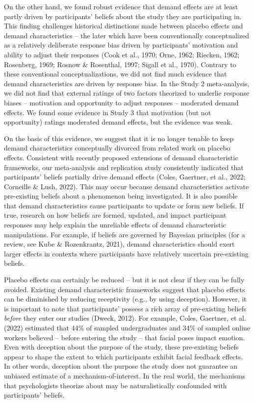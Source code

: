 \documentclass[
  man,floatsintext]{apa6}
\begin{document}
On the other hand, we found robust evidence that demand effects are at least partly driven by participants' beliefs about the study they are participating in. This finding challenges historical distinctions made between placebo effects and demand characteristics -- the later which have been conventionally conceptualized as a relatively deliberate response bias driven by participants' motivation and ability to adjust their responses (Cook et al., 1970; Orne, 1962; Riecken, 1962; Rosenberg, 1969; Rosnow \& Rosenthal, 1997; Sigall et al., 1970). Contrary to these conventional conceptualizations, we did not find much evidence that demand characteristics are driven by response bias. In the Study 2 meta-analysis, we did not find that external ratings of two factors theorized to underlie response biases -- motivation and opportunity to adjust responses -- moderated demand effects. We found some evidence in Study 3 that motivation (but not opportunity) ratings moderated demand effects, but the evidence was weak.

On the basis of this evidence, we suggest that it is no longer tenable to keep demand characteristics conceptually divorced from related work on placebo effects. Consistent with recently proposed extensions of demand characteristic frameworks, our meta-analysis and replication study consistently indicated that participants' beliefs partially drive demand effects (Coles, Gaertner, et al., 2022; Corneille \& Lush, 2022). This may occur because demand characteristics activate pre-existing beliefs about a phenomenon being investigated. It is also possible that demand characteristics cause participants to update or form new beliefs. If true, research on how beliefs are formed, updated, and impact participant responses may help explain the unreliable effects of demand characteristic manipulations. For example, if beliefs are governed by Bayesian principles (for a review, see Kube \& Rozenkrantz, 2021), demand characteristics should exert larger effects in contexts where participants have relatively uncertain pre-existing beliefs.

Placebo effects can certainly be reduced -- but it is not clear if they can be fully avoided. Existing demand characteristic frameworks suggest that placebo effects can be diminished by reducing receptivity (e.g., by using deception). However, it is important to note that participants' possess a rich array of pre-existing beliefs \emph{before} they enter our studies (Dweck, 2012). For example, Coles, Gaertner, et al. (2022) estimated that 44\% of sampled undergraduates and 34\% of sampled online workers believed -- before entering the study -- that facial poses impact emotion. Even with deception about the purpose of the study, these pre-existing beliefs appear to shape the extent to which participants exhibit facial feedback effects. In other words, deception about the purpose the study does not guarantee an unbiased estimate of a mechanism-of-interest. In the real world, the mechanisms that psychologists theorize about may be naturalistically confounded with participants' beliefs.
\end{document}
